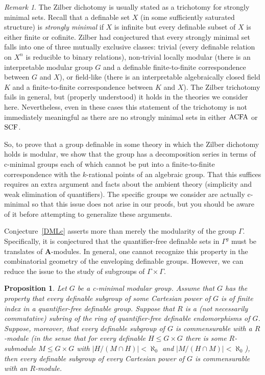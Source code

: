 \documentclass{amsart}
\newcommand{\ACFA}{{\rm ACFA}}
\newcommand{\SCF}{{\rm SCF}}
\newcommand{\bA}{{\mathbf A}}
\newtheorem{prop}[thm]{Proposition}
\theoremstyle{definition}
\theoremstyle{remark}
\newtheorem{Rk}[thm]{Remark}
\begin{document}
\begin{Rk}
The Zilber dichotomy is usually stated as a trichotomy for strongly minimal sets.
Recall that a definable set $X$ (in some sufficiently saturated structure) 
is \emph{strongly minimal} if $X$ is infinite but every definable subset of $X$ is 
either finite or cofinite.  Zilber had conjectured that every strongly minimal set falls into one of 
three mutually exclusive classes: trivial (every definable relation on $X^n$ is reducible to 
binary relations), non-trivial locally modular (there is an interpretable modular group $G$ and a definable 
finite-to-finite correspondence between $G$ and $X$), or field-like (there is an interpretable 
algebraically closed field $K$ and a finite-to-finite correspondence between $K$ and $X$).  
The Zilber trichotomy fails in general, but (properly understood) it holds in the theories 
we consider here.  Nevertheless, even in these cases this statement of the trichotomy is not 
immediately meaningful as there are no strongly minimal sets in either $\ACFA$ or $\SCF$.    
\end{Rk}


So, to prove that a group definable in some theory in which the Zilber dichotomy holds is 
modular, we show that the group has a decomposition series in terms of c-minimal groups
each of which cannot be put into a finite-to-finite correspondence with the $k$-rational 
points of an algebraic group.  That this suffices requires an extra argument and facts about the 
ambient theory (simplicity and weak elimination of quantifiers).  The specific groups we consider
are actually c-minimal so that this issue does not arise in our proofs, but you should be 
aware of it before attempting to generalize these arguments.


Conjecture~\ref{DMLc} asserts more than merely the modularity of the group $\Gamma$.  Specifically,
it is conjectured that the quantifier-free definable sets in $\Gamma^g$ must be translates of 
$\bA$-modules.  In general, one cannot recognize this property in the combinatorial 
geometry of the enveloping definable groups.  However, we can reduce the issue to the 
study of subgroups of $\Gamma \times \Gamma$.

\begin{prop}
Let $G$ be a c-minimal modular group.  Assume that $G$ has the property that every 
definable subgroup of some Cartesian power of $G$ is of finite index in 
a quantifier-free definable group. Suppose that $R$ is a (not necessarily commutative) 
subring of the ring of quantifier-free definable endomorphisms of $G$.  Suppose, moreover, that every definable 
subgroup of $G$ is commensurable with a $R$-module (in the sense that for every 
definable $H \leq G \times G$ there is some $R$-submodule $M \leq G \times G$ with $|H/(M \cap H)| < \aleph_0$ 
and $|M/(H \cap M)| < \aleph_0$), then every definable subgroup of every Cartesian 
power of $G$ is commensurable with an $R$-module.
\end{prop}
\end{document}

